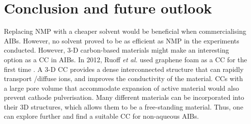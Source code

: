 \section{Conclusion and future outlook}
Replacing NMP with a cheaper solvent would be beneficial when commercialising AIBs. However, no solvent proved to be as efficient as NMP in the experiments conducted. However, 3-D carbon-based materials might make an interesting option as a CC in AIBs. In 2012, Ruoff \textit{et al.} used graphene foam as a CC for the first time \cite{ji_ultrathin_2012}. A 3-D CC provides a dense interconnected structure that can rapidly transport /diffuse ions, and improves the conductivity of the material. CCs with a large pore volume that accommodate expansion of active material would also prevent cathode pulverisation. Many different materials can be incorporated into their 3D structures, which allows them to be a free-standing material. Thus, one can explore further and find a suitable CC for non-aqueous AIBs.
